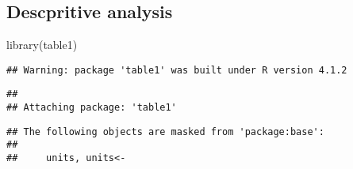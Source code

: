 \documentclass[
]{article}
\newenvironment{Shaded}{\begin{snugshade}}{\end{snugshade}}
\newcommand{\DecValTok}[1]{\textcolor[rgb]{0.00,0.00,0.81}{#1}}
\newcommand{\FloatTok}[1]{\textcolor[rgb]{0.00,0.00,0.81}{#1}}
\newcommand{\FunctionTok}[1]{\textcolor[rgb]{0.00,0.00,0.00}{#1}}
\newcommand{\NormalTok}[1]{#1}
\newcommand{\OtherTok}[1]{\textcolor[rgb]{0.56,0.35,0.01}{#1}}
\newcommand{\SpecialCharTok}[1]{\textcolor[rgb]{0.00,0.00,0.00}{#1}}
\newcommand{\StringTok}[1]{\textcolor[rgb]{0.31,0.60,0.02}{#1}}
\begin{document}
\begin{Shaded}
\end{Shaded}

\hypertarget{descpritive-analysis}{%
\subsection{Descpritive analysis}\label{descpritive-analysis}}

\begin{Shaded}
\begin{Highlighting}[]
\FunctionTok{library}\NormalTok{(table1)}
\end{Highlighting}
\end{Shaded}

\begin{verbatim}
## Warning: package 'table1' was built under R version 4.1.2
\end{verbatim}

\begin{verbatim}
## 
## Attaching package: 'table1'
\end{verbatim}

\begin{verbatim}
## The following objects are masked from 'package:base':
## 
##     units, units<-
\end{verbatim}
\end{document}
